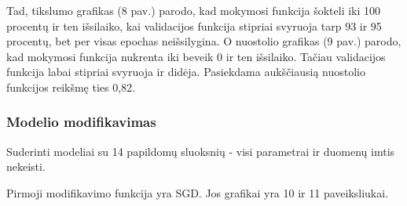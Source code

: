 \documentclass{VUMIFPSkursinis}
\begin{document}
Tad, tikslumo grafikas (8 pav.) parodo, kad mokymosi funkcija šokteli iki 100 procentų ir ten išsilaiko, kai validacijos funkcija stipriai svyruoja tarp 93 ir 95 procentų, bet per visas epochas neišsilygina.
O nuostolio grafikas (9 pav.) parodo, kad mokymosi funkcija nukrenta iki beveik 0 ir ten išsilaiko. Tačiau validacijos funkcija labai stipriai svyruoja ir didėja. Pasiekdama aukščiausią nuostolio funkcijos reikšmę ties 0,82.

\subsubsection{Modelio modifikavimas}
Suderinti modeliai su 14 papildomų sluoksnių - visi parametrai ir duomenų imtis nekeisti. %

Pirmoji modifikavimo funkcija yra SGD. Jos grafikai yra 10 ir 11 paveiksliukai.
\end{document}
